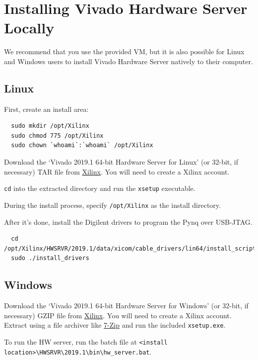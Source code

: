 \documentclass[11pt]{article}
\begin{document}
\section{Installing Vivado Hardware Server Locally}
\label{section:localserver}

We recommend that you use the provided VM, but it is also possible for Linux and Windows users to install Vivado Hardware Server natively to their computer.

\subsection{Linux}
First, create an install area:
\begin{verbatim}
  sudo mkdir /opt/Xilinx
  sudo chmod 775 /opt/Xilinx
  sudo chown `whoami`:`whoami` /opt/Xilinx
\end{verbatim}

Download the `Vivado 2019.1 64-bit Hardware Server for Linux' (or 32-bit, if necessary) TAR file from \href{https://www.xilinx.com/support/download/index.html/content/xilinx/en/downloadNav/vivado-design-tools/archive.html}{Xilinx}.
You will need to create a Xilinx account.

\texttt{cd} into the extracted directory and run the \texttt{xsetup} executable.

During the install process, specify \texttt{/opt/Xilinx} as the install directory.

After it's done, install the Digilent drivers to program the Pynq over USB-JTAG.
\begin{verbatim}
  cd /opt/Xilinx/HWSRVR/2019.1/data/xicom/cable_drivers/lin64/install_script/install_drivers
  sudo ./install_drivers
\end{verbatim}

\subsection{Windows}
Download the `Vivado 2019.1 64-bit Hardware Server for Windows' (or 32-bit, if necessary) GZIP file from \href{https://www.xilinx.com/support/download/index.html/content/xilinx/en/downloadNav/vivado-design-tools/archive.html}{Xilinx}.
You will need to create a Xilinx account.
Extract using a file archiver like \href{https://www.7-zip.org/}{7-Zip} and run the included \texttt{xsetup.exe}.

To run the HW server, run the batch file at \verb|<install location>\HWSRVR\2019.1\bin\hw_server.bat|.
\end{document}
